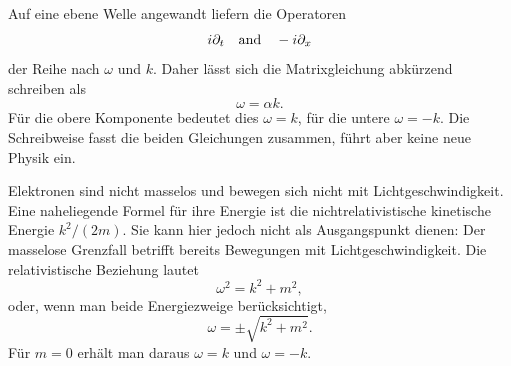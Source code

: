 Auf eine ebene Welle angewandt liefern die Operatoren
\begin{equation}
i\partial_t
\quad\hbox{and}\quad
-i\partial_x
\end{equation}
der Reihe nach \(\omega\) und \(k\). Daher lässt sich die Matrixgleichung abkürzend schreiben als
\begin{equation}
\omega=\alpha k.
\end{equation}
Für die obere Komponente bedeutet dies \(\omega=k\), für die untere \(\omega=-k\). Die Schreibweise fasst die beiden Gleichungen zusammen, führt aber keine neue Physik ein.

Elektronen sind nicht masselos und bewegen sich nicht mit Lichtgeschwindigkeit. Eine naheliegende Formel für ihre Energie ist die nichtrelativistische kinetische Energie \(k^2/(2m)\). Sie kann hier jedoch nicht als Ausgangspunkt dienen: Der masselose Grenzfall betrifft bereits Bewegungen mit Lichtgeschwindigkeit. Die relativistische Beziehung lautet
\begin{equation}
\omega^2=k^2+m^2,
\end{equation}
oder, wenn man beide Energiezweige berücksichtigt,
\begin{equation}
\omega=\pm\sqrt{k^2+m^2}.
\end{equation}
Für \(m=0\) erhält man daraus \(\omega=k\) und \(\omega=-k\).

\begin{classroomqa}
\end{classroomqa}

\begin{classroomqa}
\end{classroomqa}

